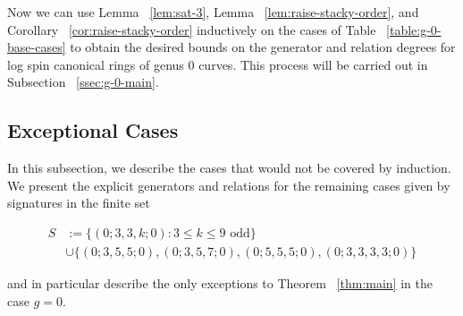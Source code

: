 \documentclass{amsart}
\theoremstyle{plain}
\theoremstyle{definition}
\theoremstyle{remark}
\numberwithin{equation}{section}
\newcommand\ssec{\subsection}
\newcommand \sx{\mathscr X}
\begin{document}
Now we can use Lemma ~\ref{lem:sat-3}, Lemma
~\ref{lem:raise-stacky-order}, and Corollary
~\ref{cor:raise-stacky-order} inductively on the cases of Table
~\ref{table:g-0-base-cases} to obtain the desired bounds on the
generator and relation degrees for log spin canonical rings of
genus 0 curves. This process will be carried out in Subsection
~\ref{ssec:g-0-main}.




\ssec{Exceptional Cases}
\label{ssec:g-0-exceptional}
In this subsection, we describe the cases that would not be covered by induction.
We present the explicit generators and relations for the remaining
cases given by signatures in the finite set

\begin{align*}
	S &:= \{(0; 3, 3, k; 0) : 3 \leq k \leq 9 \text{ odd}\} \\
		&\cup \{(0; 3, 5, 5; 0) ,(0; 3, 5, 7; 0), (0; 5, 5, 5; 0), (0; 3, 3, 3, 3; 0)\}
\end{align*}

\noindent
and in particular describe the only exceptions to Theorem ~\ref{thm:main}
in the case $g = 0$.
\end{document}
